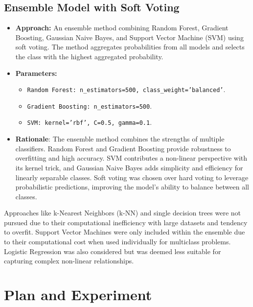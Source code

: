 \documentclass{article}
\begin{document}
\subsection{Ensemble Model with Soft Voting}
\begin{itemize}
    \item \textbf{Approach:} An ensemble method combining Random Forest, Gradient Boosting, Gaussian Naive Bayes, and Support Vector Machine (SVM) using soft voting. The method aggregates probabilities from all models and selects the class with the highest aggregated probability.
    \item \textbf{Parameters:} 
    \begin{itemize}
        \item \texttt{Random Forest: n\_estimators=500, class\_weight='balanced'}.
        \item \texttt{Gradient Boosting: n\_estimators=500}.
        \item \texttt{SVM: kernel='rbf', C=0.5, gamma=0.1}.
    \end{itemize}
    \item \textbf{Rationale}: The ensemble method combines the strengths of multiple classifiers. Random Forest and Gradient Boosting provide robustness to overfitting and high accuracy. SVM contributes a non-linear perspective with its kernel trick, and Gaussian Naive Bayes adds simplicity and efficiency for linearly separable classes. Soft voting was chosen over hard voting to leverage probabilistic predictions, improving the model's ability to balance between all classes.
\end{itemize}

Approaches like k-Nearest Neighbors (k-NN) and single decision trees were not pursued due to their computational inefficiency with large datasets and tendency to overfit. Support Vector Machines were only included within the ensemble due to their computational cost when used individually for multiclass problems. Logistic Regression was also considered but was deemed less suitable for capturing complex non-linear relationships.

\section{Plan and Experiment}
\end{document}
